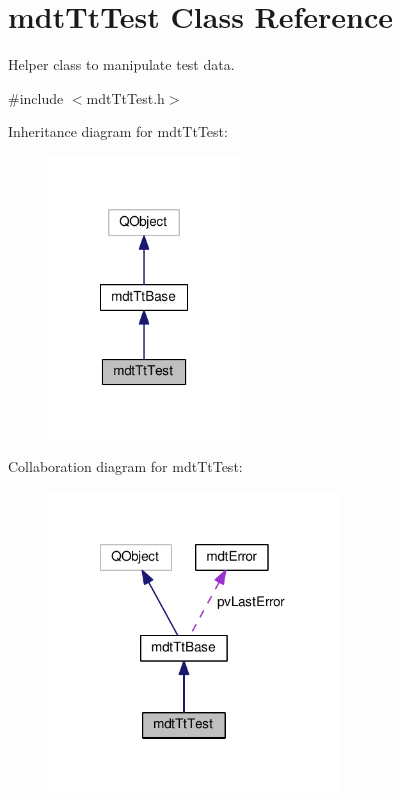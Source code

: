 \hypertarget{classmdt_tt_test}{\section{mdt\-Tt\-Test Class Reference}
\label{classmdt_tt_test}
}


Helper class to manipulate test data.  




{\ttfamily \#include $<$mdt\-Tt\-Test.\-h$>$}



Inheritance diagram for mdt\-Tt\-Test\-:\nopagebreak
\begin{figure}[H]
\begin{center}
\leavevmode
\includegraphics[width=144pt]{classmdt_tt_test__inherit__graph}
\end{center}
\end{figure}


Collaboration diagram for mdt\-Tt\-Test\-:\nopagebreak
\begin{figure}[H]
\begin{center}
\leavevmode
\includegraphics[width=218pt]{classmdt_tt_test__coll__graph}
\end{center}
\end{figure}
